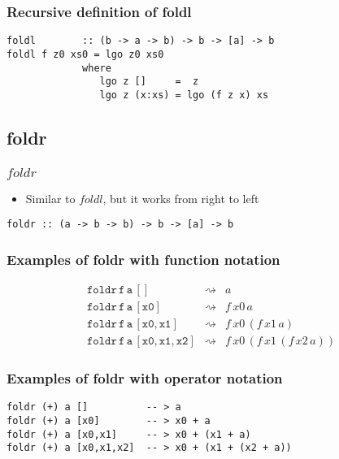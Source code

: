 \documentclass{beamer}
\begin{document}
\begin{frame}[fragile]
\frametitle{Recursive definition of foldl}

\begin{verbatim}
foldl        :: (b -> a -> b) -> b -> [a] -> b
foldl f z0 xs0 = lgo z0 xs0
             where
                lgo z []     =  z
                lgo z (x:xs) = lgo (f z x) xs
\end{verbatim}

\end{frame}

\subsection{foldr}

\begin{frame}[fragile]
\frametitle{$foldr$}
\begin{itemize}
\item Similar to $foldl$, but it works from right to left
\end{itemize}

\begin{verbatim}
foldr :: (a -> b -> b) -> b -> [a] -> b
\end{verbatim}

\end{frame}

\begin{frame}[fragile]
\frametitle{Examples of foldr with function notation}

\begin{eqnarray*}
\mathtt{foldr\,f\, a\, []            } & \rightsquigarrow & a\\
\mathtt{foldr\, f\, a\, [x0]          } & \rightsquigarrow & f\, x0\, a\\
\mathtt{foldr\, f\, a\, [x0,x1]       } & \rightsquigarrow &  f\, x0\, (f\, x1\, a)\\
\mathtt{foldr\, f\, a\, [x0,x1,x2]   } & \rightsquigarrow & f\, x0\, (f\, x1\, (f\, x2\, a))
\end{eqnarray*}

\end{frame}

\begin{frame}[fragile]
\frametitle{Examples of foldr with operator notation}

\begin{verbatim}
foldr (+) a []          -- > a
foldr (+) a [x0]        -- > x0 + a
foldr (+) a [x0,x1]     -- > x0 + (x1 + a)
foldr (+) a [x0,x1,x2]  -- > x0 + (x1 + (x2 + a))
\end{verbatim}

\end{frame}
\end{document}
